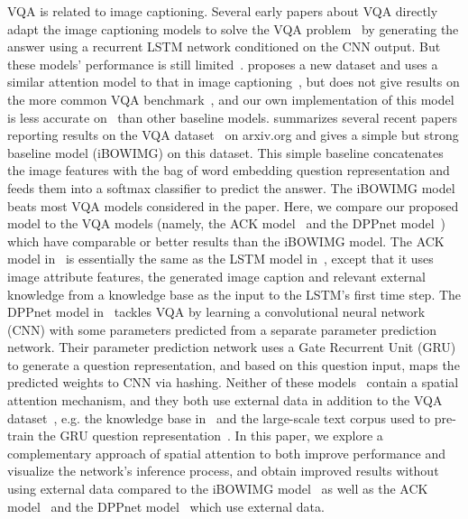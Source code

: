 VQA is  related to image captioning. Several early papers about VQA directly adapt the image captioning models to solve the VQA problem~\cite{malinowski2015ask}\cite{DBLP:journals/corr/RenKZ15} by generating the answer using a recurrent LSTM network conditioned on the CNN output. But these models' performance is still limited~\cite{malinowski2015ask}\cite{DBLP:journals/corr/RenKZ15}.
\cite{zhu2015visual7w} proposes a new dataset and uses a similar attention model to that in image captioning~\cite{xu2015show}, but does not give results on the more common VQA benchmark~\cite{DBLP:journals/corr/AntolALMBZP15}, and our own implementation of this model is less accurate on~\cite{DBLP:journals/corr/AntolALMBZP15} than other baseline models. 
\cite{zhou2015simple} summarizes several recent  papers reporting results on the VQA dataset~\cite{DBLP:journals/corr/AntolALMBZP15} on arxiv.org and gives a simple but strong baseline model (iBOWIMG) on this dataset. This simple baseline concatenates the image features with the bag of word embedding question representation and feeds them into a softmax classifier to predict the answer. The iBOWIMG model beats most VQA models considered in the paper. Here, we compare our proposed model to the VQA models (namely, the ACK model~\cite{wu2015ask} and the DPPnet model~\cite{noh2015image}) which have comparable or better results than the iBOWIMG model. 
The ACK model in~\cite{wu2015ask} is essentially the same as the LSTM model in~\cite{DBLP:journals/corr/RenKZ15}, except that it uses image attribute features, the generated image caption and relevant external knowledge from a knowledge base as the input to the LSTM's first time step. 
The DPPnet model in~\cite{noh2015image} tackles VQA by learning a convolutional neural network (CNN) with some parameters predicted from a separate parameter prediction network. Their parameter prediction network uses a Gate Recurrent Unit (GRU) to generate a question representation, and based on this question input, maps the predicted weights to CNN via hashing. 
Neither of these models~\cite{wu2015ask}\cite{noh2015image} contain a spatial attention mechanism, and they both use external data in addition to the VQA dataset~\cite{DBLP:journals/corr/AntolALMBZP15}, e.g. the knowledge base in~\cite{wu2015ask} and the large-scale text corpus used to pre-train the GRU question representation~\cite{noh2015image}. In this paper, we explore a complementary approach of spatial attention to both improve performance and visualize the network's inference process, and obtain improved results without using external data compared to the iBOWIMG model~\cite{zhou2015simple} as well as the ACK model~\cite{wu2015ask} and the DPPnet model~\cite{noh2015image} which use external data. 